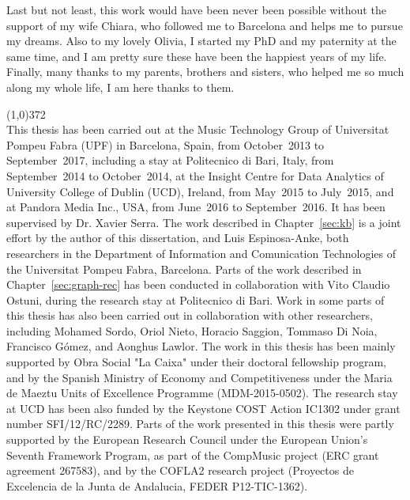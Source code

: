 Last but not least, this work would have been never been possible without the support of my wife Chiara, who followed me to Barcelona and helps me to pursue my dreams. Also to my lovely Olivia, I started my PhD and my paternity at the same time, and I am pretty sure these have been the happiest years of my life. Finally, many thanks to my parents, brothers and sisters, who helped me so much along my whole life, I am here thanks to them.

\vspace*{\fill}

\line(1,0){372}\\
\footnotesize
This thesis has been carried out at the Music Technology Group of Universitat Pompeu Fabra (UPF) in Barcelona, Spain, from October~2013 to September~2017, including a stay at Politecnico di Bari, Italy, from September~2014 to October~2014, at the Insight Centre for Data Analytics of University College of Dublin (UCD), Ireland, from May~2015 to July~2015, and at Pandora Media Inc., USA, from June~2016 to September~2016. It has been supervised by Dr. Xavier Serra.
The work described in Chapter~\ref{sec:kb} is a joint effort by the author of this dissertation, and Luis Espinosa-Anke, both researchers in the Department of Information and Comunication Technologies of the Universitat Pompeu Fabra, Barcelona. 
Parts of the work described in Chapter~\ref{sec:graph-rec} has been conducted in collaboration with Vito Claudio Ostuni, during the research stay at Politecnico di Bari. 
Work in some parts of this thesis has also been carried out in collaboration with other researchers, including Mohamed Sordo, Oriol Nieto, Horacio Saggion, Tommaso Di Noia, Francisco Gómez, and Aonghus Lawlor. 
The work in this thesis has been mainly supported by Obra Social "La Caixa" under their doctoral fellowship program, and by the Spanish Ministry of Economy and Competitiveness under the Maria de Maeztu Units of Excellence Programme (MDM-2015-0502). The research stay at UCD has been also funded by the Keystone COST Action IC1302 under grant number SFI/12/RC/2289. Parts of the work presented in this thesis were partly supported by the European Research Council under the European Union's Seventh Framework Program, as part of the CompMusic project (ERC grant agreement 267583), and by the COFLA2 research project (Proyectos de Excelencia de la Junta de Andalucia, FEDER P12-TIC-1362).
\normalsize
